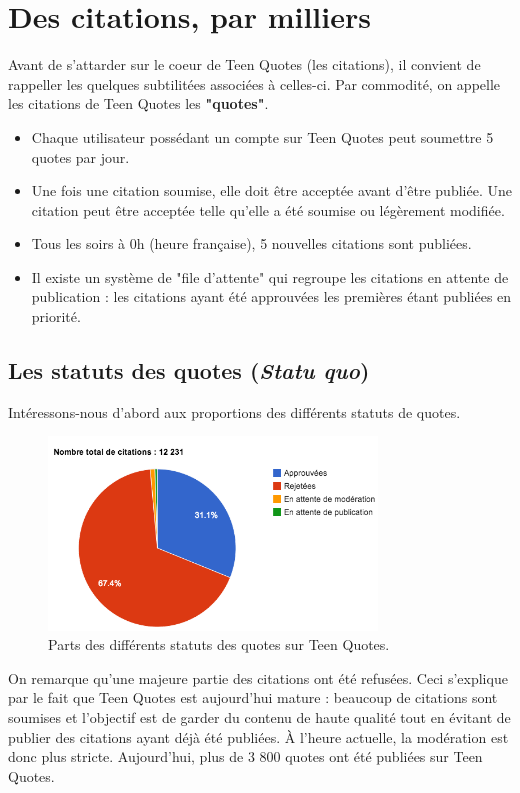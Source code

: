 \documentclass{report}
\begin{document}
	\chapter{Des citations, par milliers}
	Avant de s'attarder sur le coeur de Teen Quotes (les citations), il convient de rappeller les quelques subtilitées associées à celles-ci. Par commodité, on appelle les citations de Teen Quotes les \textbf{"quotes"}.
	\vspace{10px}
	\begin{itemize}
		\item Chaque utilisateur possédant un compte sur Teen Quotes peut soumettre 5 quotes par jour.
		\item Une fois une citation soumise, elle doit être acceptée avant d'être publiée. Une citation peut être acceptée telle qu'elle a été soumise ou légèrement modifiée.
		\item Tous les soirs à 0h (heure française), 5 nouvelles citations sont publiées.
		\item Il existe un système de "file d'attente" qui regroupe les citations en attente de publication : les citations ayant été approuvées les premières étant publiées en priorité.
	\end{itemize}

	\section{Les statuts des quotes (\textit{Statu quo})}
	Intéressons-nous d'abord aux proportions des différents statuts de quotes.
	\begin{figure}[H]
		\center
		\includegraphics[width=330px]{images/statutsQuotes.png}
		\caption{Parts des différents statuts des quotes sur Teen Quotes.}
	\end{figure}
	On remarque qu'une majeure partie des citations ont été refusées. Ceci s'explique par le fait que Teen Quotes est aujourd'hui mature : beaucoup de citations sont soumises et l'objectif est de garder du contenu de haute qualité tout en évitant de publier des citations ayant déjà été publiées. À l'heure actuelle, la modération est donc plus stricte. Aujourd'hui, plus de 3 800 quotes ont été publiées sur Teen Quotes.
\end{document}
